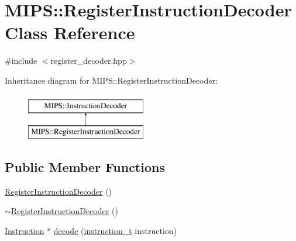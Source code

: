 \hypertarget{classMIPS_1_1RegisterInstructionDecoder}{}\section{M\+I\+PS\+:\+:Register\+Instruction\+Decoder Class Reference}
\label{classMIPS_1_1RegisterInstructionDecoder}


{\ttfamily \#include $<$register\+\_\+decoder.\+hpp$>$}

Inheritance diagram for M\+I\+PS\+:\+:Register\+Instruction\+Decoder\+:\begin{figure}[H]
\begin{center}
\leavevmode
\includegraphics[height=2.000000cm]{classMIPS_1_1RegisterInstructionDecoder}
\end{center}
\end{figure}
\subsection*{Public Member Functions}
\begin{DoxyCompactItemize}
\item 
\hyperlink{classMIPS_1_1RegisterInstructionDecoder_a2b56f30d868d3a4000f4e1bbaf012d52}{Register\+Instruction\+Decoder} ()
\item 
\hyperlink{classMIPS_1_1RegisterInstructionDecoder_a7255de32f5160a824d00764b37593282}{$\sim$\+Register\+Instruction\+Decoder} ()
\item 
\hyperlink{classMIPS_1_1Instruction}{Instruction} $\ast$ \hyperlink{classMIPS_1_1RegisterInstructionDecoder_aa58c1939e1986a36b1b82f7bb195fd57}{decode} (\hyperlink{core_8hpp_aa514fd240a0e29abb2a2e4c805d7f1a4}{instruction\+\_\+t} instruction)
\end{DoxyCompactItemize}
